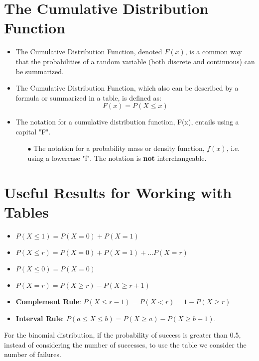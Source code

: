 
\section*{The Cumulative Distribution Function}
\begin{itemize}
\item  The Cumulative Distribution Function, denoted $F(x)$, is a common way that the probabilities
of a random variable (both discrete and continuous) can be summarized.
\item  The Cumulative Distribution Function, which also can be
described by a formula or summarized in a table, is defined as:
\[F(x) = P(X \leq x) \]
\item  The notation for a cumulative distribution function, F(x), entails using a capital
"F".  
\begin{itemize}
\item[$\bullet$] The notation for a probability mass or density function, $f(x)$, i.e. using a lowercase "f". The notation is \textbf{not} interchangeable.
\end{itemize}
\end{itemize}
\section*{Useful Results for Working with Tables}
\begin{itemize}
\item  $P(X \leq 1) = P(X=0) + P(X=1)$
\item  $P(X \leq r) = P(X=0)+ P(X=1) + \ldots P(X= r)$
\item  $P(X \leq 0) = P(X=0)$
\item  $P(X = r) = P(X \geq r ) - P(X \geq r + 1)$
\item  \textbf{Complement Rule}: $P(X \leq r-1) = P(X < r) = 1 - P(X \geq r)$
\item  \textbf{Interval Rule}: $P(a \leq X \leq  b)= P(X \geq a) - P(X \geq b + 1).$
\end{itemize}
For the binomial distribution, if the probability of success is greater than 0.5, instead of
considering the number of successes, to use the table we consider
the number of failures.
